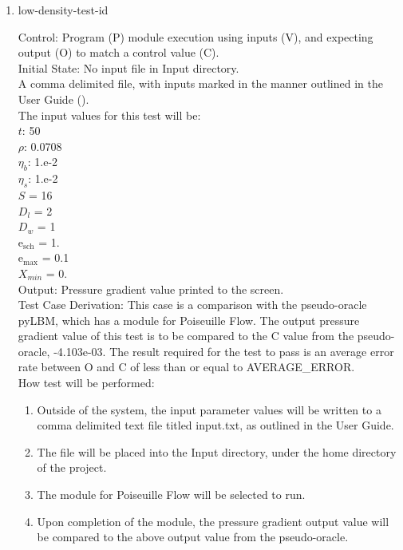 \documentclass[12pt, titlepage]{article}
\newcounter{testcounter} %
\begin{document}
\begin{enumerate}
\item{low-density-test-id\thetestcounter \\}

Control: Program (P) module execution using inputs (V), and expecting output (O) to match a control value (C).\\
					
Initial State: No input file in Input directory.\\
					
A comma delimited file, with inputs marked in the manner outlined in the User
Guide (\citet{LBM_UserGuide_PM}).\\The input values for this test will be:\\

$t$: 50\\
$\rho$: 0.0708\\
$\eta_b$: 1.e-2\\
$\eta_s$: 1.e-2\\
$S$ = 16\\
$D_{l}$ = 2\\
$D_{w}$ = 1\\
$\mathrm{e_{sch}}$ = 1.\\
$\mathrm{e_{max}}$ = 0.1\\
$X_{min}$ = 0.\\

					
Output: Pressure gradient value printed to the screen. \\ 

Test Case Derivation: This case is a comparison with the pseudo-oracle pyLBM,
which has a module for Poiseuille Flow. The output pressure gradient value of
this test is to be compared to the C value from the pseudo-oracle,
-4.103e-03. The result required for the test to pass is an average error rate
between O and C of less than or equal to AVERAGE\_ERROR.\\
					
How test will be performed: 

\begin{enumerate}
\item Outside of the system, the input parameter values will be written to a
comma delimited text file titled input.txt, as outlined in the User Guide.
\item The file will be placed into the Input directory, under the home directory
of the project.
\item The module for Poiseuille Flow will be selected to run.
\item Upon completion of the module, the pressure gradient output value will be
compared to the above output value from the pseudo-oracle.
\end{enumerate}	


\end{enumerate}
\end{document}
